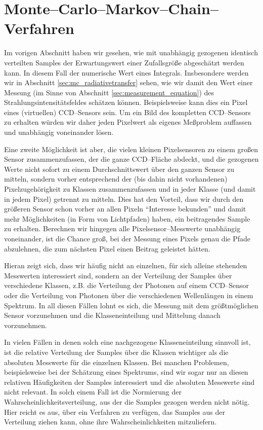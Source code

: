 	\chapter{Monte--Carlo--Markov--Chain--Verfahren}\label{chapter:mcmc}
	Im vorigen Abschnitt haben wir gesehen, wie mit unabhängig gezogenen identisch verteilten Samples der Erwartungswert einer Zufallsgröße abgeschätzt werden kann. In diesem Fall der numerische Wert eines Integrals. Insbesondere werden wir in Abschnitt \ref{sec:mc_radiativetransfer} sehen, wie wir damit den Wert einer Messung (im Sinne von Abschnitt \ref{sec:measurement_equation}) des Strahlungsintensitätsfeldes schätzen können. Beispielsweise kann dies ein Pixel eines (virtuellen) CCD--Sensors sein. Um ein Bild des kompletten CCD--Sensors zu erhalten würden wir daher jeden Pixelwert als eigenes Meßproblem auffassen und unabhängig voneinander lösen.
	
	Eine zweite Möglichkeit ist aber, die vielen kleinen Pixelsensoren zu einem großen Sensor zusammenzufassen, der die ganze CCD--Fläche abdeckt, und die gezogenen Werte nicht sofort zu einem Durchschnittswert über den ganzen Sensor zu mitteln, sondern vorher entsprechend der (bis dahin nicht vorhandenen) Pixelzugehörigkeit zu Klassen zusammenzufassen und in jeder Klasse (und damit in jedem Pixel) getrennt zu mitteln. Dies hat den Vorteil, dass wir durch den größeren Sensor schon vorher an allen Pixeln ``Interesse bekunden'' und damit mehr Möglichkeiten (in Form von Lichtpfaden) haben, ein beitragendes Sample zu erhalten. Berechnen wir hingegen alle Pixelsensor--Messwerte unabhängig voneinander, ist die Chance groß, bei der Messung eines Pixels genau die Pfade abzulehnen, die zum nächsten Pixel einen Beitrag geleistet hätten.
	
	Hieran zeigt sich, dass wir häufig nicht an einzelnen, für sich alleine stehenden Messwerten interessiert sind, sondern an der Verteilung der Samples über verschiedene Klassen, z.B. die Verteilung der Photonen auf einem CCD--Sensor oder die Verteilung von Photonen über die verschiedenen Wellenlängen in einem Spektrum. In all diesen Fällen lohnt es sich, die Messung mit dem größtmöglichen Sensor vorzunehmen und die Klasseneinteilung und Mittelung danach vorzunehmen.

	In vielen Fällen in denen solch eine nachgezogene Klasseneinteilung sinnvoll ist, ist die relative Verteilung der Samples über die Klassen wichtiger als die absoluten Messwerte für die einzelnen Klassen. Bei manchen Problemen, beispielsweise bei der Schätzung eines Spektrums, sind wir sogar nur an diesen relativen Häufigkeiten der Samples interessiert und die absoluten Messwerte sind nicht relevant. In solch einem Fall ist die Normierung der Wahrscheinlichkeitsverteilung, aus der die Samples gezogen werden nicht nötig. Hier reicht es aus, über ein Verfahren zu verfügen, das Samples aus der Verteilung ziehen kann, ohne ihre Wahrscheinlichkeiten mitzuliefern.
	
